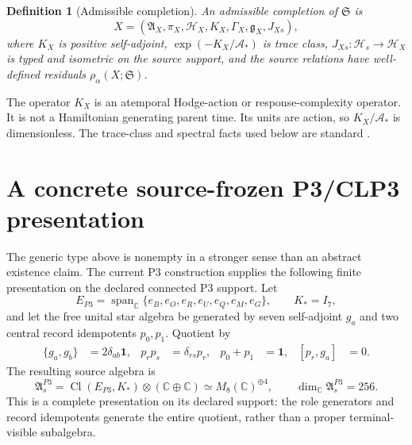 \documentclass[11pt,a4paper]{article}
\newtheorem{definition}{Definition}[section]
\theoremstyle{remark}
\newcommand{\Aseed}{\mathfrak A_s}
\newcommand{\Hseed}{\mathcal H_s}
\newcommand{\id}{\mathbf 1}
\begin{document}
\begin{definition}[Admissible completion]
An admissible completion of $\mathfrak S$ is
\begin{equation}
 X=(\mathfrak A_X,\pi_X,\mathcal H_X,K_X,\Gamma_X,
     \mathfrak g_X,J_{Xs}),
 \label{eq:candidate}
\end{equation}
where $K_X$ is positive self-adjoint, $\exp(-K_X/\mathcal A_*)$ is trace
class, $J_{Xs}:\Hseed\to\mathcal H_X$ is typed and isometric on the source
support, and the source relations have well-defined residuals
$\rho_\alpha(X;\mathfrak S)$.
\end{definition}

The operator $K_X$ is an atemporal Hodge-action or response-complexity
operator.  It is not a Hamiltonian generating parent time.  Its units are
action, so $K_X/\mathcal A_*$ is dimensionless.  The trace-class and spectral
facts used below are standard \cite{simon2005,reed1978}.

\section{A concrete source-frozen P3/CLP3 presentation}

The generic type above is nonempty in a stronger sense than an abstract
existence claim.  The current P3 construction supplies the following finite
presentation on the declared connected P3 support.  Let
\begin{equation}
 E_{P3}=\operatorname{span}_{\mathbb C}
 \{e_B,e_O,e_R,e_U,e_Q,e_M,e_G\},
 \qquad K_*=I_7,
 \label{eq:p3carrier}
\end{equation}
and let the free unital star algebra be generated by seven self-adjoint
$g_a$ and two central record idempotents $p_0,p_1$.  Quotient by
\begin{align}
 \{g_a,g_b\}&=2\delta_{ab}\id,
 &p_rp_s&=\delta_{rs}p_r,
 &p_0+p_1&=\id,
 &[p_r,g_a]&=0.
 \label{eq:p3relations}
\end{align}
The resulting source algebra is
\begin{equation}
 \Aseed^{P3}
 =\operatorname{Cl}(E_{P3},K_*)\otimes(\mathbb C\oplus\mathbb C)
 \simeq M_8(\mathbb C)^{\oplus4},
 \qquad \dim_{\mathbb C}\Aseed^{P3}=256.
 \label{eq:p3algebra}
\end{equation}
This is a complete presentation on its declared support: the role generators
and record idempotents generate the entire quotient, rather than a proper
terminal-visible subalgebra.
\end{document}
